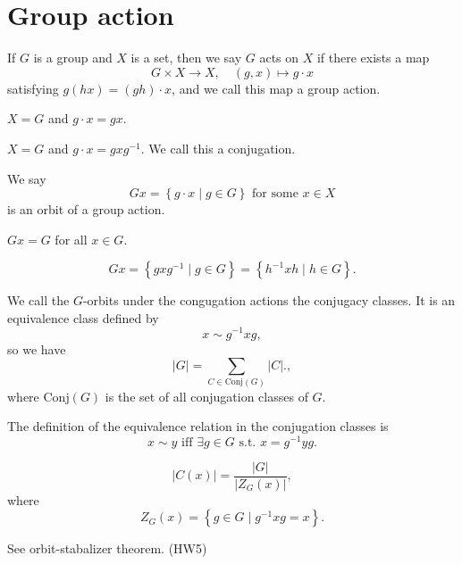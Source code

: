 \section{Group action}
\begin{definition}
    If \(G\) is a group and \(X\) is a set, then we say \(G\) acts on \(X\) if there exists a map 
    \[
        G \times X \to X, \quad (g, x) \mapsto g \cdot x
    \] satisfying \(g \left( hx \right) = (gh) \cdot x \), and we call this map a group action. 
\end{definition}

\begin{eg}
    \(X = G\) and \(g \cdot x = gx\).  
\end{eg}

\begin{eg}
    \(X=G\) and \(g \cdot x = gxg^{-1}\). We call this a conjugation.  
\end{eg}

\begin{definition}
    We say
    \[
        Gx = \left\{ g \cdot x \mid g \in G \right\} \text{ for some } x \in X
    \] is an orbit of a group action.
\end{definition}

\begin{eg}
    \(Gx=G\) for all \(x \in G\).  
\end{eg}

\begin{eg}
    \[
        Gx = \left\{ gxg^{-1} \mid g \in G \right\} = \left\{ h^{-1} x h \mid h \in G \right\}.  
    \]
\end{eg}

\begin{definition}
    We call the \(G\)-orbits under the congugation actions the conjugacy classes. It is an equivalence class defined by 
    \[
        x \sim g^{-1} x g, 
    \] so we have 
    \[
        \vert G \vert = \sum_{C \in \mathrm{Conj}(G) }  \vert C \vert .,  
    \]where \(\mathrm{Conj}(G) \) is the set of all conjugation classes of \(G\).  
\end{definition}
\begin{note}
    The definition of the equivalence relation in the conjugation classes is 
    \[
        x \sim y \text{ iff } \exists g \in G \text{ s.t. } x = g^{-1} y g.
    \]
\end{note}
\begin{proposition}
    \[
        \vert C(x) \vert = \frac{\vert G \vert}{\left\vert Z_G(x) \right\vert }, 
    \] where 
    \[
        Z_G(x) = \left\{ g \in G \mid g^{-1} x g = x \right\}. 
    \]
\end{proposition}
\begin{remark}
    See orbit-stabalizer theorem. (HW5)
\end{remark}

